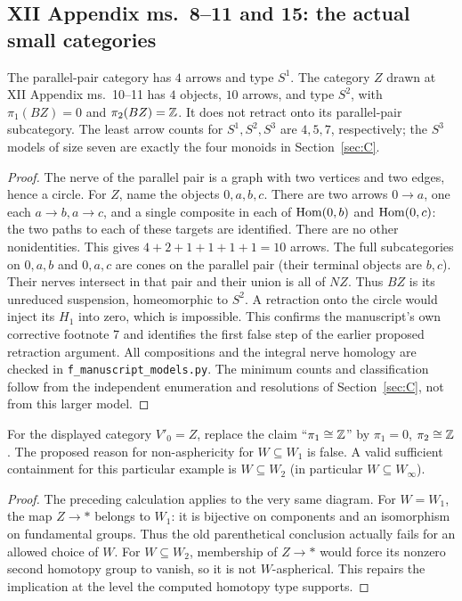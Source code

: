 \subsection{XII Appendix ms.~8--11 and 15: the actual small categories}
\begin{proposition}\label{F:XII-models}
The parallel-pair category has $4$ arrows and type $S^1$. The category
$Z$ drawn at XII Appendix ms.~10--11 has $4$ objects, $10$ arrows, and
type $S^2$, with $\pi_1(BZ)=0$ and $\pi_2(BZ)=\mathbb Z$. It does not retract
onto its parallel-pair subcategory. The least arrow counts for
$S^1,S^2,S^3$ are $4,5,7$, respectively; the $S^3$ models of size seven
are exactly the four monoids in Section~\ref{sec:C}.
\end{proposition}
\begin{proof}
The nerve of the parallel pair is a graph with two vertices and two
edges, hence a circle. For $Z$, name the objects $0,a,b,c$. There are
two arrows $0\to a$, one each $a\to b,a\to c$, and a single composite in each of $\operatorname{Hom}(0,b)$ and $\operatorname{Hom}(0,c)$:
the two paths to each of these targets are identified. There are no other
nonidentities. This gives $4+2+1+1+1+1=10$ arrows. The full subcategories
on $0,a,b$ and $0,a,c$ are cones on the parallel pair (their terminal
objects are $b,c$). Their nerves intersect in that pair and their union
is all of $NZ$. Thus $BZ$ is its unreduced suspension, homeomorphic to
$S^2$. A retraction onto the circle would inject its $H_1$ into zero,
which is impossible. This confirms the manuscript's own corrective
footnote 7 and identifies the first false step of the earlier proposed
retraction argument. All compositions and the integral nerve homology
are checked in \texttt{f\_manuscript\_models.py}. The minimum counts and
classification follow from the independent enumeration and resolutions
of Section~\ref{sec:C}, not from this larger model.
\end{proof}

\begin{corollary}\label{F:XII15}
For the displayed category $V'_0=Z$, replace the claim
``$\pi_1\cong\mathbb Z$'' by $\pi_1=0$, $\pi_2\cong\mathbb Z$.
The proposed reason for non-asphericity for $W\subseteq W_1$ is false.
A valid sufficient containment for this particular example is
$W\subseteq W_2$ (in particular $W\subseteq W_\infty$).
\end{corollary}
\begin{proof}
The preceding calculation applies to the very same diagram.
For $W=W_1$, the map $Z\to *$ belongs to $W_1$: it is bijective on
components and an isomorphism on fundamental groups. Thus the old
parenthetical conclusion actually fails for an allowed choice of $W$.
For $W\subseteq W_2$, membership of $Z\to *$ would force its nonzero
second homotopy group to vanish, so it is not $W$-aspherical. This repairs
the implication at the level the computed homotopy type supports.
\end{proof}








